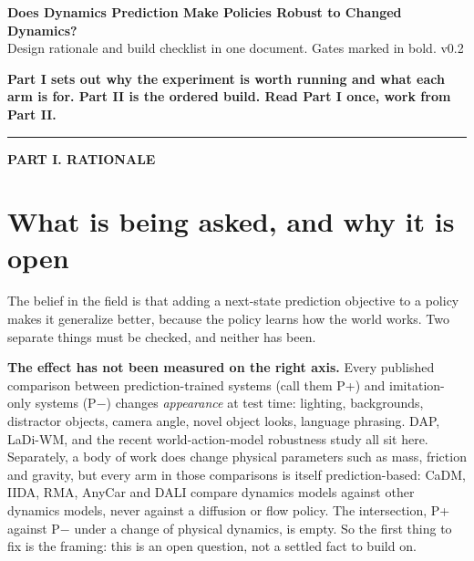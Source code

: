 \documentclass[9pt]{extarticle}
\begin{document}
\begin{center}
{\large \textbf{Does Dynamics Prediction Make Policies Robust to Changed Dynamics?}}\\[0.1em]
{\footnotesize Design rationale and build checklist in one document. Gates marked in bold. v0.2}
\end{center}

\textbf{Part I sets out why the experiment is worth running and what each arm is for. Part II is the ordered build. Read Part I once, work from Part II.}

\begin{center}\rule{0.35\textwidth}{0.4pt}\end{center}
\begin{center}{\small\bfseries PART I. RATIONALE}\end{center}

\section{What is being asked, and why it is open}

The belief in the field is that adding a next-state prediction objective to a policy makes it generalize better, because the policy learns how the world works. Two separate things must be checked, and neither has been.

\textbf{The effect has not been measured on the right axis.} Every published comparison between prediction-trained systems (call them P+) and imitation-only systems (P$-$) changes \emph{appearance} at test time: lighting, backgrounds, distractor objects, camera angle, novel object looks, language phrasing. DAP, LaDi-WM, and the recent world-action-model robustness study all sit here. Separately, a body of work does change physical parameters such as mass, friction and gravity, but every arm in those comparisons is itself prediction-based: CaDM, IIDA, RMA, AnyCar and DALI compare dynamics models against other dynamics models, never against a diffusion or flow policy. The intersection, P+ against P$-$ under a change of physical dynamics, is empty. So the first thing to fix is the framing: this is an open question, not a settled fact to build on.
\end{document}

